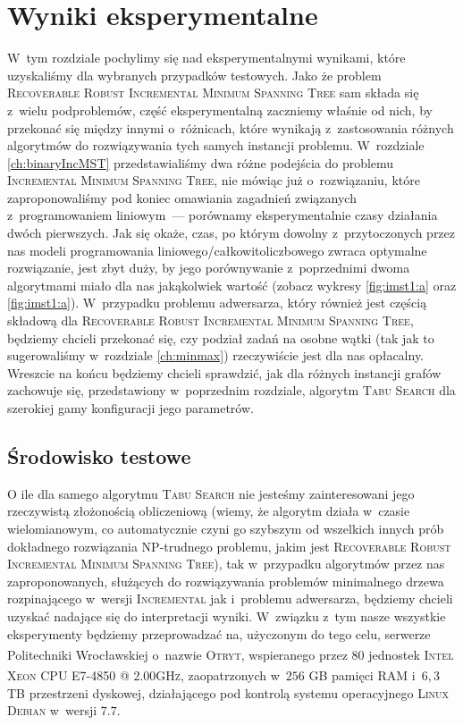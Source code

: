 \chapter{Wyniki eksperymentalne}\label{ch:exp}
\thispagestyle{chapterBeginStyle}





W~tym rozdziale pochylimy się nad eksperymentalnymi wynikami, które uzyskaliśmy dla wybranych przypadków testowych.
Jako że problem \textsc{Recoverable Robust Incremental Minimum Spanning Tree} sam składa się z~wielu podproblemów, część eksperymentalną zaczniemy właśnie od nich, by przekonać się między innymi o~różnicach, które wynikają z~zastosowania różnych algorytmów do rozwiązywania tych samych instancji problemu.
W~rozdziale \ref{ch:binaryIncMST} przedstawialiśmy dwa różne podejścia do problemu \textsc{Incremental Minimum Spanning Tree}, nie mówiąc już o~rozwiązaniu, które zaproponowaliśmy pod koniec omawiania zagadnień związanych z~programowaniem liniowym~--- porównamy eksperymentalnie czasy działania dwóch pierwszych.
Jak się okaże, czas, po którym dowolny z~przytoczonych przez nas modeli programowania liniowego/całkowitoliczbowego zwraca optymalne rozwiązanie, jest zbyt duży, by jego porównywanie z~poprzednimi dwoma algorytmami miało dla nas jakąkolwiek wartość (zobacz wykresy \ref{fig:imst1:a} oraz \ref{fig:imst1:a}).
W~przypadku problemu adwersarza, który również jest częścią składową dla \textsc{Recoverable Robust Incremental Minimum Spanning Tree}, będziemy chcieli przekonać się, czy podział zadań na osobne wątki (tak jak to sugerowaliśmy w~rozdziale \ref{ch:minmax}) rzeczywiście jest dla nas opłacalny.
Wreszcie na końcu będziemy chcieli sprawdzić, jak dla różnych instancji grafów zachowuje się, przedstawiony w~poprzednim rozdziale, algorytm \textsc{Tabu Search} dla szerokiej gamy konfiguracji jego parametrów.




\section{Środowisko testowe}




O ile dla samego algorytmu \textsc{Tabu Search} nie jesteśmy zainteresowani jego rzeczywistą złożonością obliczeniową (wiemy, że algorytm działa w~czasie wielomianowym, co automatycznie czyni go szybszym od wszelkich innych prób dokładnego rozwiązania \textsc{NP}-trudnego problemu, jakim jest \textsc{Recoverable Robust Incremental Minimum Spanning Tree}), tak w~przypadku algorytmów przez nas zaproponowanych, służących do rozwiązywania problemów minimalnego drzewa rozpinającego w~wersji \textsc{Incremental} jak i~problemu adwersarza, będziemy chcieli uzyskać nadające się do interpretacji wyniki.
W~związku z~tym nasze wszystkie eksperymenty będziemy przeprowadzać na, użyczonym do tego celu, serwerze Politechniki Wrocławskiej o~nazwie \textsc{Otryt}, wspieranego przez $80$ jednostek \textsc{Intel\textsuperscript{\textregistered} Xeon\textsuperscript{\textregistered} CPU E7-4850 @ 2.00GHz}, zaopatrzonych w~$256$ \textsc{GB} pamięci \textsc{RAM} i~$6,3$ \textsc{TB} przestrzeni dyskowej, działającego pod kontrolą systemu operacyjnego \textsc{Linux Debian} w~wersji $7.7$.

